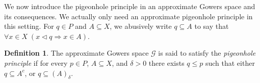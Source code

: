 \documentclass[a4paper,11pt]{article}
\theoremstyle{definition}
\newtheorem{defin}[thm]{Definition}
\numberwithin{equation}{section}
\newcommand{\X}{\mathcal{X}}
\newcommand{\G}{\mathcal{G}}
\newcommand{\I}{\textbf{I}}
\newcommand{\II}{\textbf{II}}
\begin{document}

\smallskip

We now introduce the pigeonhole principle in an approximate Gowers space and its consequences. We actually only need an approximate pigeonhole principle in this setting. For $q \in P$ and $A \subseteq X$, we abusively write $q \subseteq A$ to say that $\forall x \in X \; (x \vartriangleleft q \Rightarrow x \in A)$.

\begin{defin}

The approximate Gowers space $\G$ is said to satisfy the \emph{pigeonhole principle} if for every $p \in P$, $A \subseteq X$, and $\delta > 0$ there exists $q \leqslant p$ such that either $q \subseteq A^c$, or $q \subseteq (A)_\delta$.

\end{defin}
\end{document}
